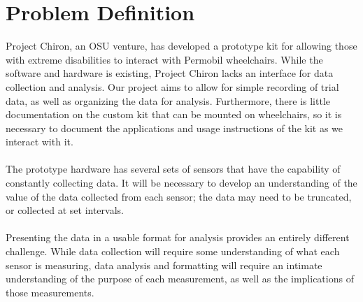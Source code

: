 \documentclass[onecolumn, draftclsnofoot,10pt, compsoc]{IEEEtran}
\begin{document}
\section{Problem Definition}
Project Chiron, an OSU venture, has developed a prototype kit for allowing those with extreme disabilities to interact with Permobil wheelchairs. While the software and hardware is existing, Project Chiron lacks an interface for data collection and analysis. Our project aims to allow for simple recording of trial data, as well as organizing the data for analysis. Furthermore, there is little documentation on the custom kit that can be mounted on wheelchairs, so it is necessary to document the applications and usage instructions of the kit as we interact with it.
\\\\
The prototype hardware has several sets of sensors that have the capability of constantly collecting data. It will be necessary to develop an understanding of the value of the data collected from each sensor; the data may need to be truncated, or collected at set intervals.
\\\\
Presenting the data in a usable format for analysis provides an entirely different challenge. While data collection will require some understanding of what each sensor is measuring, data analysis and formatting will require an intimate understanding of the purpose of each measurement, as well as the implications of those measurements.
\end{document}
